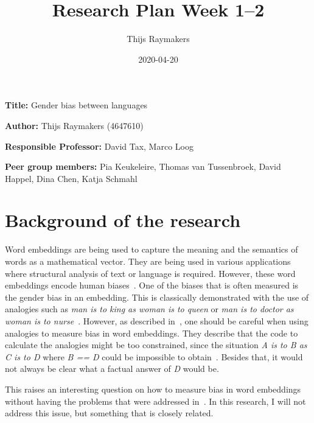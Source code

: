 \documentclass[english, a4paper, 11pt]{article}
\title{Research Plan Week 1--2}
\author{Thijs Raymakers}
\date{2020-04-20}
\newcommand{\namelistlabel}[1]{\mbox{#1}\hfil}
\newenvironment{namelist}[1]{%
\begin{list}{}
    {
        \let\makelabel\namelistlabel
        \settowidth{\labelwidth}{#1}
        \setlength{\leftmargin}{1.1\labelwidth}
    }
  }{%
\end{list}}
\begin{document}
\maketitle

\begin{namelist}{xxxxxxxxxxxxxxxxxxxxxxxxxxxxxxxxxxxxxxx}
\item[{\bf Title:}]
    Gender bias between languages
\item[{\bf Author:}]
    Thijs Raymakers (4647610)
\item[{\bf Responsible Professor:}]
    David Tax, Marco Loog
\item[{\bf Peer group members:}]
    Pia Keukeleire, 
    Thomas van Tussenbroek,
    David Happel,
    Dina Chen,
    Katja Schmahl
\end{namelist}


\section*{Background of the research}
Word embeddings are being used to capture the meaning and the semantics of words as a
mathematical vector. They are being used in various applications where structural
analysis of text or language is required. However, these word embeddings encode
human biases~\cite{caliskan_2017_semantics_language_corpora, 2019arXiv190509866N, 2017arXiv171108412G, 2018arXiv180309288K, 2019arXiv190303862G}. One of the biases that is often
measured is the gender bias in an embedding. This is classically demonstrated with the
use of analogies such as \textit{man is to king as woman is to queen} or \textit{man is to doctor as woman is to nurse}~\cite{2019arXiv190509866N}.
However, as described in~\cite{2019arXiv190509866N}, one should be careful when using
analogies to measure bias in word embeddings. They describe that the code to calculate
the analogies might be too constrained, since the situation \textit{A is to B as C is to D}
where \textit{B == D} could be impossible to obtain~\cite{2019arXiv190509866N}. Besides
that, it would not always be clear what a factual answer of \textit{D} would be.

This raises an interesting question on how to measure bias in word embeddings without
having the problems that were addressed in~\cite{2019arXiv190509866N}.
In this research, I will not address this issue, but something that is closely related.
\end{document}
